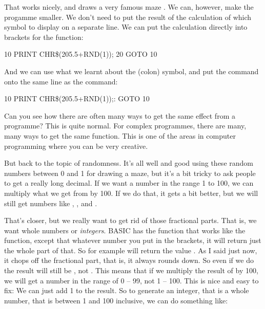 
\needspace{2cm}
That works nicely, and draws a very famous maze \cite{montfort201210}.
We can, however, make the progamme smaller.  We don't need to put the
result of the calculation of which symbol to display on a separate
line.  We can put the calculation directly into brackets for the
 function:

\begin{screenoutput}
10 PRINT CHR\$(205.5+RND(1));
20 GOTO 10
\end{screenoutput}

\needspace{2cm}
And we can use what we learnt about the \stw{:} (colon) symbol, and
put the  command onto the same line as the 
command:

\begin{screenoutput}
10 PRINT CHR\$(205.5+RND(1));: GOTO 10
\end{screenoutput}

Can you see how there are often many ways to get the same effect from
a programme? This is quite normal. For complex programmes, there are
many, many ways to get the same function.  This is one of the areas
in computer programming where you can be very creative.

But back to the topic of randomness. It's all well and good using
these random numbers between 0 and 1 for drawing a maze, but it's a
bit tricky to ask people to get a really long decimal.  If we want a
number in the range 1 to 100, we can multiply what we get from
 by 100. If we do that, it gets a bit better, but we will
still get numbers like , ,
 and .

\needspace{3cm}
That's closer, but we really want to get rid of those fractional
parts. That is, we want whole numbers or {\em integers}.  BASIC has
the  function that works like the  function,
except that whatever number you put in the brackets, it will return
just the whole part of that.  So for example  will
return the value . As I said just now, it chops off the
fractional part, that is, it always rounds down. So even if we do
 the result will still be , not .
This means that if we multiply the result of  by 100, we
will get a number in the range of 0 -- 99, not 1 -- 100. This is nice
and easy to fix: We can just add 1 to the result.  So to generate an
integer, that is a whole number, that is between 1 and 100 inclusive,
we can do something like:

